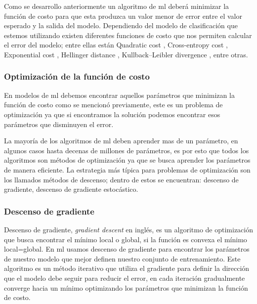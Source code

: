 Como se desarrollo anteriormente un algoritmo de \ac{ml} deberá minimizar la función de costo para que esta produzca un valor menor de error entre el valor esperado y la salida del modelo. Dependiendo del modelo de clasificación que estemos utilizando existen diferentes funciones de costo que nos permiten calcular el error del modelo; entre ellas están Quadratic cost \citep{quadratic_cost}, Cross-entropy cost \citep{cross_entropy}, Exponential cost \citep{exponential_cost}, Hellinger distance \citep{Hellinger}, Kullback–Leibler divergence \citep{kullback}, entre otras.


\subsubsection{Optimización de la función de costo} 
En modelos de \ac{ml} debemos encontrar aquellos parámetros que minimizan la función de costo como se mencionó previamente, este es un problema de optimización ya que si encontramos la solución podemos encontrar esos parámetros que disminuyen el error.

La mayoría de los algoritmos de \ac{ml} deben aprender mas de un parámetro, en algunos casos hasta decenas de millones de parámetros, es por esto que todos los algoritmos  son métodos de optimización ya que se busca aprender los parámetros de manera eficiente. La estrategia más típica para problemas de optimización son los llamados métodos de descenso; dentro de estos se encuentran: descenso de gradiente, descenso de gradiente estocástico.

\subsubsection{Descenso de gradiente}\label{sub:gradient-desc}
Descenso de gradiente, \textit{gradient descent} en inglés, es un algoritmo de optimización que busca encontrar el mínimo local o global, si la función es convexa el mínimo local=global. En \ac{ml} usamos descenso de gradiente para encontrar los parámetros de nuestro modelo que mejor definen nuestro conjunto de entrenamiento. Este algoritmo es un método iterativo que utiliza el gradiente para definir la dirección que el modelo debe seguir para reducir el error, en cada iteración gradualmente converge hacia un mínimo optimizando los parámetros que minimizan la función de costo. 


